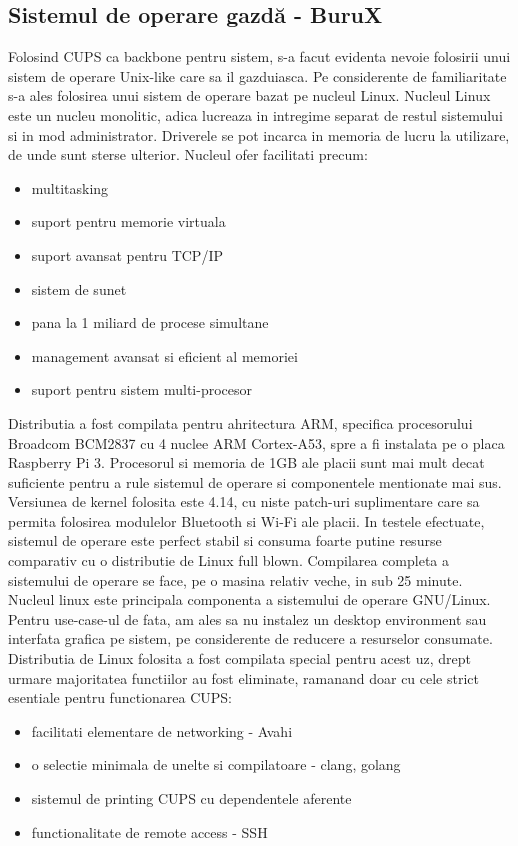 \documentclass[12pt]{report}
\begin{document}
		\subsection{Sistemul de operare gazdă - BuruX}
Folosind CUPS ca backbone pentru sistem, s-a facut evidenta nevoie folosirii unui sistem de operare Unix-like care sa il gazduiasca. Pe considerente de familiaritate s-a ales folosirea unui sistem de operare bazat pe nucleul Linux. 
Nucleul Linux este un nucleu monolitic, adica lucreaza in intregime separat de restul sistemului si in mod administrator. Driverele se pot incarca in memoria de lucru la utilizare, de unde sunt sterse ulterior. Nucleul ofer facilitati precum:
\begin{itemize}
\item multitasking
\item suport pentru memorie virtuala
\item suport avansat pentru TCP/IP
\item sistem de sunet
\item pana la 1 miliard de procese simultane
\item management avansat si eficient al memoriei
\item suport pentru sistem multi-procesor
\end{itemize}

Distributia a fost compilata pentru ahritectura ARM, specifica procesorului Broadcom BCM2837 cu 4 nuclee ARM Cortex-A53, spre a fi instalata pe o placa Raspberry Pi 3. Procesorul si memoria de 1GB ale placii sunt mai mult decat suficiente pentru a rule sistemul de operare si componentele mentionate mai sus. Versiunea de kernel folosita este 4.14, cu niste patch-uri suplimentare care sa permita folosirea modulelor Bluetooth si Wi-Fi ale placii. In testele efectuate, sistemul de operare este perfect stabil si consuma foarte putine resurse comparativ cu o distributie de Linux full blown. Compilarea completa a sistemului de operare se face, pe o masina relativ veche, in sub 25 minute. Nucleul linux este principala componenta a sistemului de operare GNU/Linux. Pentru use-case-ul de fata, am ales sa nu instalez un desktop environment sau interfata grafica pe sistem, pe considerente de reducere a resurselor consumate. 
 Distributia de Linux folosita a fost compilata special pentru acest uz, drept urmare majoritatea functiilor au fost eliminate, ramanand doar cu cele strict esentiale pentru functionarea CUPS:
\begin{itemize}
\item facilitati elementare de networking - Avahi
\item o selectie minimala de unelte si compilatoare - clang, golang
\item sistemul de printing CUPS cu dependentele aferente
\item functionalitate de remote access - SSH
\end{itemize}
\end{document}
